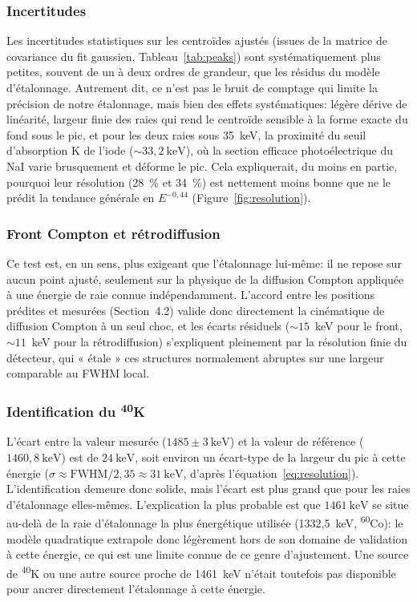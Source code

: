 \documentclass[11pt,letterpaper]{article}
\begin{document}
\subsubsection*{Incertitudes}
Les incertitudes statistiques sur les centroïdes ajustés (issues de la matrice de covariance du fit gaussien, Tableau~\ref{tab:peaks}) sont systématiquement plus petites, souvent de un à deux ordres de grandeur, que les résidus du modèle d'étalonnage. Autrement dit, ce n'est pas le bruit de comptage qui limite la précision de notre étalonnage, mais bien des effets systématiques: légère dérive de linéarité, largeur finie des raies qui rend le centroïde sensible à la forme exacte du fond sous le pic, et pour les deux raies sous 35~keV, la proximité du seuil d'absorption K de l'iode ($\sim 33{,}2~\text{keV}$), où la section efficace photoélectrique du NaI varie brusquement et déforme le pic. Cela expliquerait, du moins en partie, pourquoi leur résolution (28~\% et 34~\%) est nettement moins bonne que ne le prédit la tendance générale en $E^{-0{,}44}$ (Figure~\ref{fig:resolution}).

\subsubsection*{Front Compton et rétrodiffusion}
Ce test est, en un sens, plus exigeant que l'étalonnage lui-même: il ne repose sur aucun point ajusté, seulement sur la physique de la diffusion Compton appliquée à une énergie de raie connue indépendamment. L'accord entre les positions prédites et mesurées (Section~4.2) valide donc directement la cinématique de diffusion Compton à un seul choc, et les écarts résiduels ($\sim 15$~keV pour le front, $\sim 11$~keV pour la rétrodiffusion) s'expliquent pleinement par la résolution finie du détecteur, qui « étale » ces structures normalement abruptes sur une largeur comparable au FWHM local.

\subsubsection*{Identification du \textsuperscript{40}K}
L'écart entre la valeur mesurée ($1485 \pm 3~\text{keV}$) et la valeur de référence ($1460{,}8~\text{keV}$) est de $24~\text{keV}$, soit environ un écart-type de la largeur du pic à cette énergie ($\sigma \approx \text{FWHM}/2{,}35 \approx 31~\text{keV}$, d'après l'équation~\ref{eq:resolution}). L'identification demeure donc solide, mais l'écart est plus grand que pour les raies d'étalonnage elles-mêmes. L'explication la plus probable est que $1461~\text{keV}$ se situe au-delà de la raie d'étalonnage la plus énergétique utilisée (1332,5~keV, \textsuperscript{60}Co): le modèle quadratique extrapole donc légèrement hors de son domaine de validation à cette énergie, ce qui est une limite connue de ce genre d'ajustement. Une source de \textsuperscript{40}K ou une autre source proche de 1461~keV n'était toutefois pas disponible pour ancrer directement l'étalonnage à cette énergie.
\end{document}
